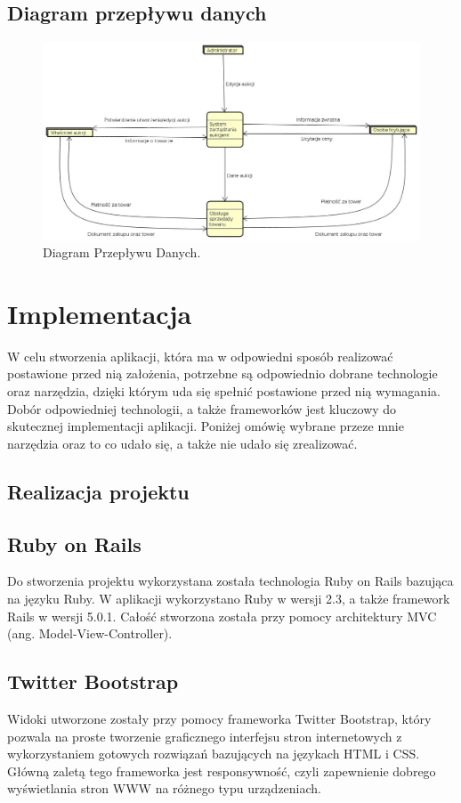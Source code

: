 \documentclass[brudnopis]{xmgr}
\begin{document}
\newpage

\section{Diagram przepływu danych}
\begin{figure}[!tbh]
\centering
\includegraphics[width=.9\linewidth]{fig/DFD}
\caption{Diagram Przepływu Danych.}
\end{figure}

\chapter{Implementacja}
W celu stworzenia aplikacji, która ma w odpowiedni sposób realizować postawione przed nią
założenia, potrzebne są odpowiednio dobrane technologie oraz narzędzia, dzięki którym uda się 
spełnić postawione przed nią wymagania. Dobór odpowiedniej technologii, a także frameworków 
jest kluczowy do skutecznej implementacji aplikacji. Poniżej omówię wybrane przeze mnie narzędzia oraz to co udało się, a także nie udało się zrealizować.

\section{Realizacja projektu}


\section{Ruby on Rails}
Do stworzenia projektu wykorzystana została technologia Ruby on Rails bazująca na języku Ruby.
W aplikacji wykorzystano Ruby w wersji 2.3, a także framework Rails w wersji 5.0.1. Całość stworzona
została przy pomocy architektury MVC (ang. Model-View-Controller).

\section{Twitter Bootstrap}
Widoki utworzone zostały przy pomocy frameworka Twitter Bootstrap, który pozwala na proste tworzenie
graficznego interfejsu stron internetowych z wykorzystaniem gotowych rozwiązań bazujących na językach
HTML i CSS. Główną zaletą tego frameworka jest responsywność, czyli zapewnienie dobrego wyświetlania
stron WWW na różnego typu urządzeniach. 
\end{document}

